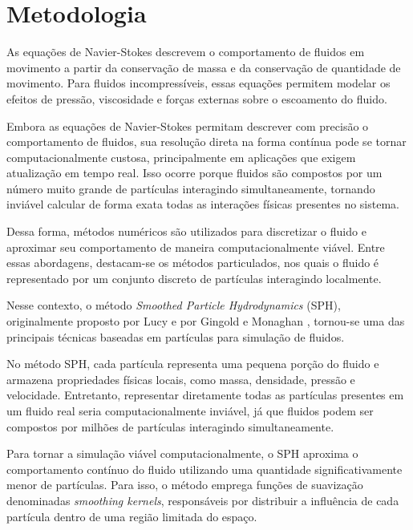 \section{Metodologia}
\label{sec:metodologia}


As equações de Navier-Stokes descrevem o comportamento de fluidos em movimento
a partir da conservação de massa e da conservação de quantidade de movimento.
Para fluidos incompressíveis, essas equações permitem modelar os efeitos de
pressão, viscosidade e forças externas sobre o escoamento do fluido.

Embora as equações de Navier-Stokes permitam descrever com precisão o
comportamento de fluidos, sua resolução direta na forma contínua pode se tornar
computacionalmente custosa, principalmente em aplicações que exigem atualização
em tempo real. Isso ocorre porque fluidos são compostos por um número muito
grande de partículas interagindo simultaneamente, tornando inviável calcular de
forma exata todas as interações físicas presentes no sistema.

Dessa forma, métodos numéricos são utilizados para discretizar o fluido e
aproximar seu comportamento de maneira computacionalmente viável. Entre essas
abordagens, destacam-se os métodos particulados, nos quais o fluido é
representado por um conjunto discreto de partículas interagindo localmente.

Nesse contexto, o método \textit{Smoothed Particle Hydrodynamics} (SPH),
originalmente proposto por Lucy \cite{lucy1977numerical} e por Gingold e
Monaghan \cite{gingold1977smoothed}, tornou-se uma das principais técnicas
baseadas em partículas para simulação de fluidos.

No método SPH, cada partícula representa uma pequena porção do fluido e
armazena propriedades físicas locais, como massa, densidade, pressão e
velocidade. Entretanto, representar diretamente todas as partículas presentes
em um fluido real seria computacionalmente inviável, já que fluidos podem ser
compostos por milhões de partículas interagindo simultaneamente.

Para tornar a simulação viável computacionalmente, o SPH aproxima o
comportamento contínuo do fluido utilizando uma quantidade significativamente
menor de partículas. Para isso, o método emprega funções de suavização
denominadas \textit{smoothing kernels}, responsáveis por distribuir a
influência de cada partícula dentro de uma região limitada do espaço.

